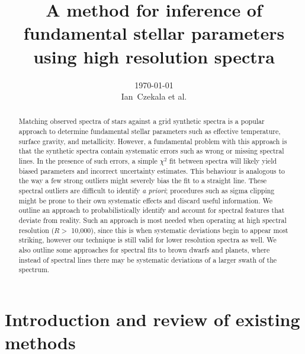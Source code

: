 \documentclass[preprint]{aastex} %
\begin{document}
\title{A method for inference of fundamental stellar parameters using high resolution spectra}
\author{\today{}\\
\medskip
Ian~Czekala et al.
}


\begin{abstract}
  Matching observed spectra of stars against a grid synthetic spectra is a popular approach to determine fundamental stellar parameters such as effective temperature, surface gravity, and metallicity. However, a fundamental problem with this approach is that the synthetic spectra contain systematic errors such as wrong or missing spectral lines. In the presence of such errors, a simple $\chi^2$ fit between spectra will likely yield biased parameters and incorrect uncertainty estimates. This behaviour is analogous to the way a few strong outliers might severely bias the fit to a straight line. These spectral outliers are difficult to identify \emph{a priori}; procedures such as sigma clipping might be prone to their own systematic effects and discard useful information. We outline an approach to probabilistically identify and account for spectral features that deviate from reality. Such an approach is most needed when operating at high spectral resolution ($R >$ 10,000), since this is when systematic deviations begin to appear most striking, however our technique is still valid for lower resolution spectra as well. We also outline some approaches for spectral fits to brown dwarfs and planets, where instead of spectral lines there may be systematic deviations of a larger swath of the spectrum.
\end{abstract}



\section{Introduction and review of existing methods}
\end{document}
